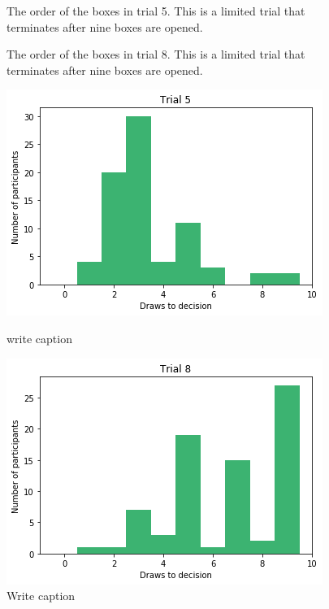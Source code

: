\begin{figure}
    \centering
    \scalebox{0.8}{}
    \caption[Order of boxes in trial 5]{The order of the boxes in trial 5. This is a limited trial that terminates after nine boxes are opened.}
    \label{fig:trial5_order}
\end{figure}
\begin{figure}
    \centering
    \scalebox{0.8}{}
    \caption[Order of boxes in trial 8]{The order of the boxes in trial 8. This is a limited trial that terminates after nine boxes are opened.}
    \label{fig:trial8_order}
\end{figure}
\begin{figure}
    \centering
    \begin{minipage}{0.45\textwidth} 
        \centering
        \includegraphics[scale=0.4]{pictures/dtd5_histogram.png}
        \caption[Draws to decisions in trial 5]{write caption}
        \label{fig:histogram_trial5}
    \end{minipage}\hfill
    \begin{minipage}{0.45\textwidth} 
        \centering
        \includegraphics[scale=0.4]{pictures/dtd8_histogram.png}
        \caption[Draws to decisions in trial 8]{Write caption}
        \label{fig:histogram_trial8}
    \end{minipage}
\end{figure}

